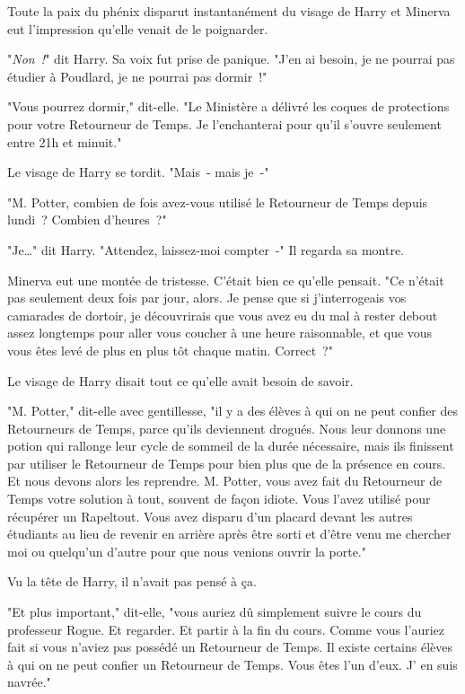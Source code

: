 Toute la paix du phénix disparut instantanément du visage de Harry et Minerva eut l'impression qu'elle venait de le poignarder.

"\emph{Non~!}" dit Harry. Sa voix fut prise de panique. "J'en ai besoin, je ne pourrai pas étudier à Poudlard, je ne pourrai pas dormir~!"

"Vous pourrez dormir," dit-elle. "Le Ministère a délivré les coques de protections pour votre Retourneur de Temps. Je l'enchanterai pour qu'il s'ouvre seulement entre 21h et minuit."

Le visage de Harry se tordit. "Mais~- mais je~-"

"M. Potter, combien de fois avez-vous utilisé le Retourneur de Temps depuis lundi~? Combien d'heures~?"

"Je…" dit Harry. "Attendez, laissez-moi compter~-" Il regarda sa montre.

Minerva eut une montée de tristesse. C'était bien ce qu'elle pensait. "Ce n'était pas seulement deux fois par jour, alors. Je pense que si j'interrogeais vos camarades de dortoir, je découvrirais que vous avez eu du mal à rester debout assez longtemps pour aller vous coucher à une heure raisonnable, et que vous vous êtes levé de plus en plus tôt chaque matin. Correct~?"

Le visage de Harry disait tout ce qu'elle avait besoin de savoir.

"M. Potter," dit-elle avec gentillesse, "il y a des élèves à qui on ne peut confier des Retourneurs de Temps, parce qu'ils deviennent drogués. Nous leur donnons une potion qui rallonge leur cycle de sommeil de la durée nécessaire, mais ils finissent par utiliser le Retourneur de Temps pour bien plus que de la présence en cours. Et nous devons alors les reprendre. M. Potter, vous avez fait du Retourneur de Temps votre solution à tout, souvent de façon idiote. Vous l'avez utilisé pour récupérer un Rapeltout. Vous avez disparu d'un placard devant les autres étudiants au lieu de revenir en arrière après être sorti et d'être venu me chercher moi ou quelqu'un d'autre pour que nous venions ouvrir la porte."

Vu la tête de Harry, il n'avait pas pensé à ça.

"Et plus important," dit-elle, "vous auriez dû simplement suivre le cours du professeur Rogue. Et regarder. Et partir à la fin du cours. Comme vous l'auriez fait si vous n'aviez pas possédé un Retourneur de Temps. Il existe certains élèves à qui on ne peut confier un Retourneur de Temps. Vous êtes l'un d'eux. J' en suis navrée."

